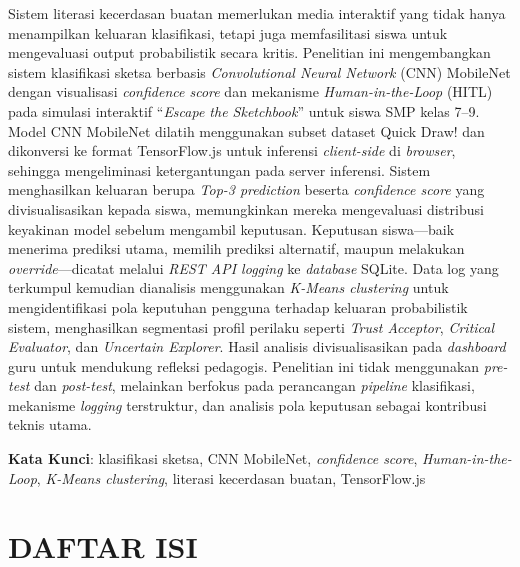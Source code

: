 \documentclass[10pt,twoside,openright]{report}
\newcommand{\blankpage}{%
  \afterpage{%
    \null
    \vfill
    \begin{center}
      {\small Halaman ini sengaja dikosongkan}
    \end{center}
    \vfill
    \thispagestyle{plain}
    \newpage
  }%
}
\begin{document}
Sistem literasi kecerdasan buatan memerlukan media interaktif yang tidak hanya menampilkan keluaran klasifikasi, tetapi juga memfasilitasi siswa untuk mengevaluasi output probabilistik secara kritis. Penelitian ini mengembangkan sistem klasifikasi sketsa berbasis \textit{Convolutional Neural Network} (CNN) MobileNet dengan visualisasi \textit{confidence score} dan mekanisme \textit{Human-in-the-Loop} (HITL) pada simulasi interaktif ``\textit{Escape the Sketchbook}'' untuk siswa SMP kelas 7--9. Model CNN MobileNet dilatih menggunakan subset dataset Quick Draw! dan dikonversi ke format TensorFlow.js untuk inferensi \textit{client-side} di \textit{browser}, sehingga mengeliminasi ketergantungan pada server inferensi. Sistem menghasilkan keluaran berupa \textit{Top-3 prediction} beserta \textit{confidence score} yang divisualisasikan kepada siswa, memungkinkan mereka mengevaluasi distribusi keyakinan model sebelum mengambil keputusan. Keputusan siswa---baik menerima prediksi utama, memilih prediksi alternatif, maupun melakukan \textit{override}---dicatat melalui \textit{REST API logging} ke \textit{database} SQLite. Data log yang terkumpul kemudian dianalisis menggunakan \textit{K-Means clustering} untuk mengidentifikasi pola keputuhan pengguna terhadap keluaran probabilistik sistem, menghasilkan segmentasi profil perilaku seperti \textit{Trust Acceptor}, \textit{Critical Evaluator}, dan \textit{Uncertain Explorer}. Hasil analisis divisualisasikan pada \textit{dashboard} guru untuk mendukung refleksi pedagogis. Penelitian ini tidak menggunakan \textit{pre-test} dan \textit{post-test}, melainkan berfokus pada perancangan \textit{pipeline} klasifikasi, mekanisme \textit{logging} terstruktur, dan analisis pola keputusan sebagai kontribusi teknis utama.

\vspace{0.5cm}

\noindent\textbf{Kata Kunci}: klasifikasi sketsa, CNN MobileNet, \textit{confidence score}, \textit{Human-in-the-Loop}, \textit{K-Means clustering}, literasi kecerdasan buatan, TensorFlow.js

\blankpage

\chapter*{DAFTAR ISI}
\end{document}
